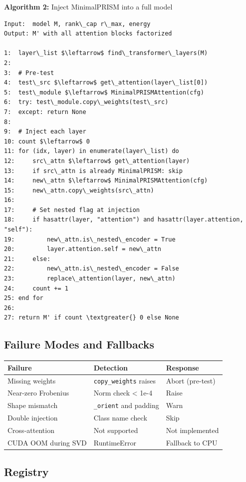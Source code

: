 \textbf{Algorithm 2:} Inject MinimalPRISM into a full model
\begin{lstlisting}
Input:  model M, rank\_cap r\_max, energy  
Output: M' with all attention blocks factorized

1:  layer\_list $\leftarrow$ find\_transformer\_layers(M)
2:
3:  # Pre-test
4:  test\_src $\leftarrow$ get\_attention(layer\_list[0])
5:  test\_module $\leftarrow$ MinimalPRISMAttention(cfg)
6:  try: test\_module.copy\_weights(test\_src)
7:  except: return None
8:
9:  # Inject each layer
10: count $\leftarrow$ 0
11: for (idx, layer) in enumerate(layer\_list) do
12:     src\_attn $\leftarrow$ get\_attention(layer)
13:     if src\_attn is already MinimalPRISM: skip
14:     new\_attn $\leftarrow$ MinimalPRISMAttention(cfg)
15:     new\_attn.copy\_weights(src\_attn)
16:
17:     # Set nested flag at injection
18:     if hasattr(layer, "attention") and hasattr(layer.attention, "self"):
19:         new\_attn.is\_nested\_encoder = True
20:         layer.attention.self = new\_attn
21:     else:
22:         new\_attn.is\_nested\_encoder = False
23:         replace\_attention(layer, new\_attn)
24:     count += 1
25: end for
26:
27: return M' if count \textgreater{} 0 else None
\end{lstlisting}

\subsection{Failure Modes and Fallbacks}

\begin{table}[H]
\centering
\small
\begin{tabular}{lll}
\toprule
\textbf{Failure} & \textbf{Detection} & \textbf{Response} \\
\midrule
Missing weights & \texttt{copy\_weights} raises & Abort (pre-test) \\
Near-zero Frobenius & Norm check \textless{} 1e-4 & Raise \\
Shape mismatch & \texttt{\_orient} and padding & Warn \\
Double injection & Class name check & Skip \\
Cross-attention & Not supported & Not implemented \\
CUDA OOM during SVD & RuntimeError & Fallback to CPU \\
\bottomrule
\end{tabular}
\end{table}

\subsection{Registry}

